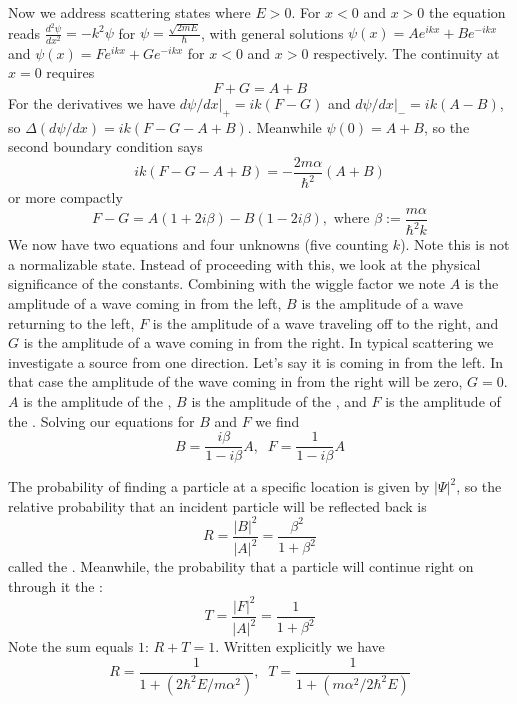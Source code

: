 \documentclass[12pt, a4paper, oneside, openright, titlepage]{book}
\begin{document}
Now we address scattering states where $E > 0$. For $x < 0$ and $x > 0$ the equation reads $\frac{d^2\psi}{dx^2} = -k^2\psi$ for $\psi = \frac{\sqrt{2mE}}{\hbar}$, with general solutions $\psi(x) = Ae^{ikx} +Be^{-ikx}$ and $\psi(x) = Fe^{ikx} + Ge^{-ikx}$ for $x < 0$ and $x > 0$ respectively. The continuity at $x = 0$ requires $$F+G = A+B$$
For the derivatives we have $d\psi/dx\vert_+ = ik(F-G)$ and $d\psi/dx\vert_- = ik(A-B)$, so $\Delta(d\psi/dx) = ik(F-G-A+B)$. Meanwhile $\psi(0) = A+B$, so the second boundary condition says \begin{equation*}
    ik(F-G-A+B) = -\frac{2m\alpha}{\hbar^2}(A+B)
\end{equation*}
or more compactly \begin{equation*}
    F-G = A(1+2i\beta)-B(1-2i\beta),\text{ where }\beta :=\frac{m\alpha}{\hbar^2k}
\end{equation*}
We now have two equations and four unknowns (five counting $k$). Note this is not a normalizable state. Instead of proceeding with this, we look at the physical significance of the constants. Combining with the wiggle factor we note $A$ is the amplitude of a wave coming in from the left, $B$ is the amplitude of a wave returning to the left, $F$ is the amplitude of a wave traveling off to the right, and $G$ is the amplitude of a wave coming in from the right. In typical scattering we investigate a source from one direction. Let's say it is coming in from the left. In that case the amplitude of the wave coming in from the right will be zero, $G = 0$. $A$ is the amplitude of the , $B$ is the amplitude of the , and $F$ is the amplitude of the . Solving our equations for $B$ and $F$ we find \begin{equation*}
    B = \frac{i\beta}{1-i\beta}A,\;\;F = \frac{1}{1-i\beta}A
\end{equation*}

The probability of finding a particle at a specific location is given by $|\Psi|^2$, so the relative probability that an incident particle will be reflected back is \begin{equation*}
    R = \frac{|B|^2}{|A|^2} = \frac{\beta^2}{1+\beta^2}
\end{equation*}
called the . Meanwhile, the probability that a particle will continue right on through it the :\begin{equation*}
    T = \frac{|F|^2}{|A|^2} = \frac{1}{1+\beta^2}
\end{equation*}
Note the sum equals $1$: $R+T = 1$. Written explicitly we have \begin{equation*}
    \boxed{R=\frac{1}{1+(2\hbar^2E/m\alpha^2)},\;\;T=\frac{1}{1+(m\alpha^2/2\hbar^2E)}}
\end{equation*}
\end{document}
